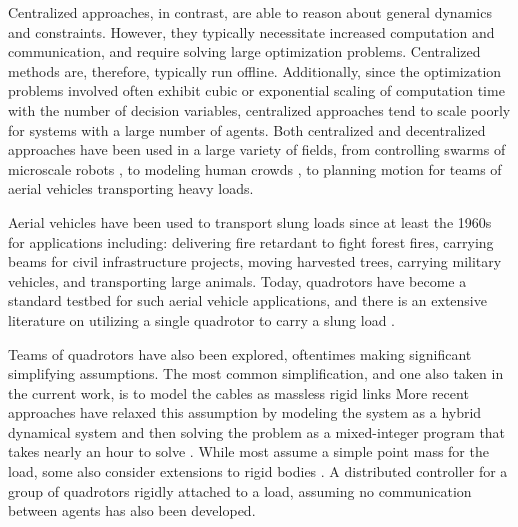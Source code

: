 \documentclass[../root.tex]{subfiles}
\begin{document}
Centralized approaches, in contrast, are able to reason about general
dynamics and constraints. However, they typically necessitate increased
computation and communication, and require solving large optimization
problems. Centralized methods are, therefore, typically run offline.
Additionally, since the optimization problems involved often exhibit cubic or
exponential scaling of computation time with the number of decision
variables, centralized approaches tend to scale poorly for systems with a
large number of agents. Both centralized and decentralized approaches have
been used in a large variety of fields, from controlling swarms of microscale
robots \cite{woern_Iswarm_2006}, to modeling human crowds \cite{bera_Realtime_2014},
to planning motion for teams of aerial vehicles
transporting heavy loads.

Aerial vehicles have been used to transport slung loads since at least the
1960s \cite{lancashire_Investigation_1966} for applications including:
delivering fire retardant to fight forest fires, carrying beams for civil
infrastructure projects, moving harvested trees, carrying military vehicles,
and transporting large animals. Today, quadrotors have become a standard
testbed for such aerial vehicle applications, and there is an extensive
literature on utilizing a single quadrotor to carry a slung load
\cite{sreenath_Geometric_2013,tang_Mixed_2015,decrousaz_Aggressive_2014,foehn_Fast_2017}.

Teams of quadrotors have also been explored, oftentimes making significant
simplifying assumptions. The most common simplification, and one also taken
in the current work, is to model the cables as massless rigid links
\cite{michael_Cooperative_2011,bernard_Autonomous_2011,tang_Aggressive_2018,lee_Geometric_2013,lee_Geometric_2014}
More recent approaches have relaxed this
assumption by modeling the system as a hybrid dynamical system and then
solving the problem as a mixed-integer program that takes nearly an hour to
solve \cite{tang_Mixed_2015}. While most assume a simple point mass for the
load, some also consider extensions to rigid bodies
\cite{michael_Cooperative_2011,lee_Geometric_2014}. 
A distributed controller for
a group of quadrotors rigidly attached to a load, assuming no communication
between agents \cite{wang_Cooperative_2018} has also been developed.
\end{document}

